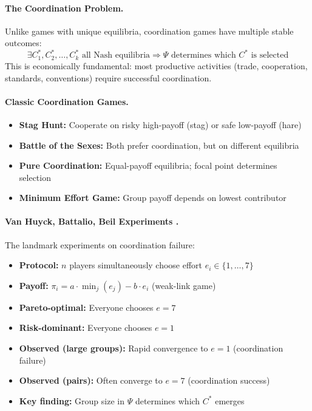 \paragraph{The Coordination Problem.}
Unlike games with unique equilibria, coordination games have multiple stable outcomes:
\begin{equation}
\exists C^*_1, C^*_2, \ldots, C^*_k \text{ all Nash equilibria} \Rightarrow
\Psi \text{ determines which } C^* \text{ is selected}
\tag{EV-COORD}
\end{equation}
This is economically fundamental: most productive activities (trade, cooperation,
standards, conventions) require successful coordination.

\paragraph{Classic Coordination Games.}
\begin{itemize}[nosep]
    \item \textbf{Stag Hunt:} Cooperate on risky high-payoff (stag) or safe low-payoff (hare)
    \item \textbf{Battle of the Sexes:} Both prefer coordination, but on different equilibria
    \item \textbf{Pure Coordination:} Equal-payoff equilibria; focal point determines selection
    \item \textbf{Minimum Effort Game:} Group payoff depends on lowest contributor
\end{itemize}

\paragraph{Van Huyck, Battalio, Beil Experiments \citep{vanhuyck1990,vanhuyck1991}.}
The landmark experiments on coordination failure:
\begin{itemize}[nosep]
    \item \textbf{Protocol:} $n$ players simultaneously choose effort $e_i \in \{1, \ldots, 7\}$
    \item \textbf{Payoff:} $\pi_i = a \cdot \min_j(e_j) - b \cdot e_i$ (weak-link game)
    \item \textbf{Pareto-optimal:} Everyone chooses $e = 7$
    \item \textbf{Risk-dominant:} Everyone chooses $e = 1$
    \item \textbf{Observed (large groups):} Rapid convergence to $e = 1$ (coordination failure)
    \item \textbf{Observed (pairs):} Often converge to $e = 7$ (coordination success)
    \item \textbf{Key finding:} Group size in $\Psi$ determines which $C^*$ emerges
\end{itemize}

